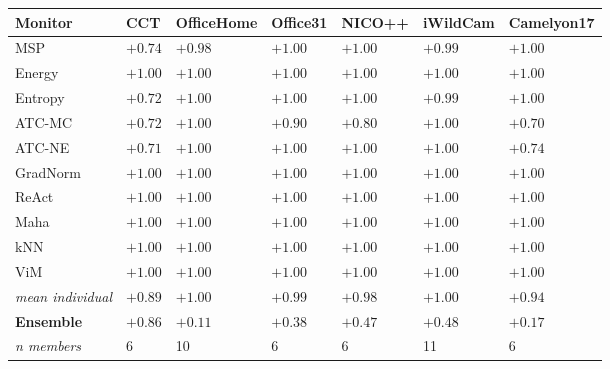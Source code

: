 \begin{tabularx}{\linewidth}{l *{6}{Y}}
\toprule
Monitor & CCT & OfficeHome & Office31 & NICO++ & iWildCam & Camelyon17 \\
\midrule
MSP & $+0.74$ & $+0.98$ & $+1.00$ & $+1.00$ & $+0.99$ & $+1.00$ \\
Energy & $+1.00$ & $+1.00$ & $+1.00$ & $+1.00$ & $+1.00$ & $+1.00$ \\
Entropy & $+0.72$ & $+1.00$ & $+1.00$ & $+1.00$ & $+0.99$ & $+1.00$ \\
ATC-MC & $+0.72$ & $+1.00$ & $+0.90$ & $+0.80$ & $+1.00$ & $+0.70$ \\
ATC-NE & $+0.71$ & $+1.00$ & $+1.00$ & $+1.00$ & $+1.00$ & $+0.74$ \\
GradNorm & $+1.00$ & $+1.00$ & $+1.00$ & $+1.00$ & $+1.00$ & $+1.00$ \\
ReAct & $+1.00$ & $+1.00$ & $+1.00$ & $+1.00$ & $+1.00$ & $+1.00$ \\
Maha & $+1.00$ & $+1.00$ & $+1.00$ & $+1.00$ & $+1.00$ & $+1.00$ \\
kNN & $+1.00$ & $+1.00$ & $+1.00$ & $+1.00$ & $+1.00$ & $+1.00$ \\
ViM & $+1.00$ & $+1.00$ & $+1.00$ & $+1.00$ & $+1.00$ & $+1.00$ \\
\midrule
\emph{mean individual} & $+0.89$ & $+1.00$ & $+0.99$ & $+0.98$ & $+1.00$ & $+0.94$ \\
\textbf{Ensemble} & $\mathbf{+0.86}$ & $\mathbf{+0.11}$ & $\mathbf{+0.38}$ & $\mathbf{+0.47}$ & $\mathbf{+0.48}$ & $\mathbf{+0.17}$ \\
\quad\emph{\footnotesize n members} & {\footnotesize 6} & {\footnotesize 10} & {\footnotesize 6} & {\footnotesize 6} & {\footnotesize 11} & {\footnotesize 6} \\
\bottomrule
\end{tabularx}

